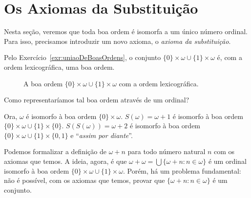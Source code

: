 \section{Os Axiomas da Substituição}\label{sec:axiomasDaSubstituicao}
Nesta seção, veremos que toda boa ordem é isomorfa a um único número ordinal.
Para isso, precisamos introduzir um novo axioma, o \emph{axioma da substituição}.

Pelo Exercício~\ref{exr:uniaoDeBoasOrdens}, o conjunto $\{0\}\times \omega\cup\{1\}\times \omega$ é, com a ordem lexicográfica, uma boa ordem.


\begin{figure}[h]
    \centering
    \caption{A boa ordem $\{0\}\times \omega\cup\{1\}\times \omega$ com a ordem lexicográfica.}
\end{figure}

Como representaríamos tal boa ordem através de um ordinal?

Ora, $\omega$ é isomorfo à boa ordem $\{0\}\times \omega$.
$S(\omega)=\omega+1$ é isomorfo à boa ordem $\{0\}\times \omega\cup\{1\}\times \{0\}$.
$S(S(\omega))=\omega+2$ é isomorfo à boa ordem $\{0\}\times \omega\cup\{1\}\times \{0, 1\}$ e
``\emph{assim por diante}''.

Podemos formalizar a definição de $\omega+n$ para todo número natural $n$ com os axiomas que temos.
A ideia, agora, é que $\omega+\omega=\bigcup\{\omega+n : n\in \omega\}$ é um ordinal isomorfo à boa ordem $\{0\}\times \omega\cup\{1\}\times \omega$.
Porém, há um problema fundamental: não é possível, com os axiomas que temos, provar que $\{\omega+n : n\in \omega\}$ é um conjunto.

